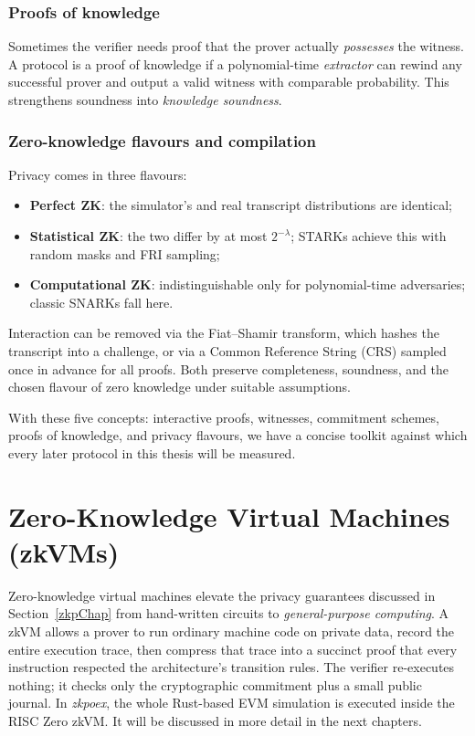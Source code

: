 \subsubsection{Proofs of knowledge}\label{Chap2.3.pok}
Sometimes the verifier needs proof that the prover actually \emph{possesses} the witness. A protocol is a proof of knowledge if a polynomial-time \emph{extractor} can rewind any successful prover and output a valid witness with comparable probability. This strengthens soundness into \emph{knowledge soundness}.

\subsubsection{Zero-knowledge flavours and compilation}\label{Chap2.3.zk}
Privacy comes in three flavours:
\begin{itemize}
  \item \textbf{Perfect ZK}: the simulator’s and real transcript
        distributions are identical;
  \item \textbf{Statistical ZK}: the two differ by at most
        $2^{-\lambda}$; STARKs achieve this with random masks and FRI
        sampling;
  \item \textbf{Computational ZK}: indistinguishable only for
        polynomial-time adversaries; classic SNARKs fall here.
\end{itemize}
Interaction can be removed via the Fiat–Shamir transform, which hashes the
transcript into a challenge, or via a Common Reference String (CRS) sampled
once in advance for all proofs.  Both preserve completeness, soundness, and
the chosen flavour of zero knowledge under suitable assumptions.

With these five concepts: interactive proofs, witnesses, commitment
schemes, proofs of knowledge, and privacy flavours, we have a concise
toolkit against which every later protocol in this thesis will be measured.


\section{Zero-Knowledge Virtual Machines (zkVMs)} \label{zkvm}
Zero-knowledge virtual machines elevate the privacy guarantees discussed in Section~\ref{zkpChap} from hand-written circuits to \textit{general-purpose computing}.  
A zkVM allows a prover to run ordinary machine code on private data, record the entire execution trace, then compress that trace into a succinct proof that every instruction respected the architecture's transition rules.  
The verifier re-executes nothing; it checks only the cryptographic commitment plus a small public journal.  
In \textit{zkpoex}, the whole Rust-based EVM simulation is executed inside the RISC Zero zkVM. It will be discussed in more detail in the next chapters. 

